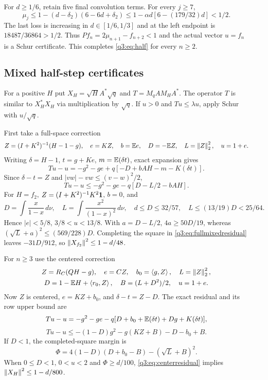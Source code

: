 For $d\ge1/6$, retain five final convolution terms. For every $j\ge7$,
\[
 \mu_j\le1-(d-\delta_{2})(6-6d+\delta_{2})
 \le1-\alpha d[6-(179/32)d]<1/2.
\]
The last loss is increasing in $d\in[1/6,1/3]$ and at the left endpoint is $18487/36864>1/2$. Thus
$Pf_n=2\mu_{n+1}-f_{n+2}<1$ and the actual vector $u=f_n$ is a Schur certificate. This completes \eqref{q3:eq:half} for every $n\ge2$.

\subsection{Mixed half-step certificates}
For a positive $H$ put $X_H=\sqrt H A^*\sqrt q$ and $T=M_qAM_HA^*$. The operator $T$ is similar to $X_H^*X_H$ via multiplication by $\sqrt q$. If $u>0$ and $Tu\le\lambda u$, apply Schur with $u/\sqrt q$.

First take a full-space correction
\[
 Z=(I+K^2)^{-1}(H-1-g),\quad e=KZ,\quad
 b=\mathbb E e,\quad D=-\mathbb E Z,\quad L=\left\lVert Z\right\rVert_2^2,\quad u=1+e.
\]
Writing $\delta=H-1$, $t=g+Ke$, $m=\mathbb E(\delta t)$, exact expansion gives
\[
 Tu-u=-g^2-ge+q[-D+bAH-m-K(\delta t)].
\]
Since $\delta-t=Z$ and $|vw|-vw\le(v-w)^2/2$,
\begin{equation}\label{q3:eq:fullmixedresidual}
 Tu-u\le-g^2-ge-q[D-L/2-bAH].
\end{equation}
For $H=f_2$, $Z=(I+K^2)^{-1}K^2\mathbf1$, $b=0$, and
\[
 D=\int\frac{x}{1-x}\,d\nu,\quad
 L=\int\frac{x^2}{(1-x)^2}\,d\nu,\quad
 d\le D\le32/57,\quad L\le(13/19)D<25/64.
\]
Hence $|e|<5/8$, $3/8<u<13/8$. With $a=D-L/2$,
$4a\ge50D/19$, whereas $(\sqrt L+a)^2\le(569/228)D$.
Completing the square in \eqref{q3:eq:fullmixedresidual} leaves $-31D/912$, so
$\left\lVert X_{f_2}\right\rVert^2\le1-d/48$.

For $n\ge3$ use the centered correction
\[
 \begin{gathered}
 Z=R_C(QH-g),\quad e=CZ,\quad b_0=\left\langle g,Z\right\rangle,\quad L=\left\lVert Z\right\rVert_2^2,\\
 D=1-\mathbb E H+\left\langle r_0,Z\right\rangle,\quad B=(L+D^2)/2,\quad u=1+e.
 \end{gathered}
\]
Now $Z$ is centered, $e=KZ+b_0$, and $\delta-t=Z-D$. The exact residual and its row upper bound are
\[
 Tu-u=-g^2-ge-q[D+b_0+\mathbb E(\delta t)+Dg+K(\delta t)],
\]
\begin{equation}\label{q3:eq:centerresidual}
 Tu-u\le-(1-D)g^2-g(KZ+B)-D-b_0+B.
\end{equation}
If $D<1$, the completed-square margin is
\[
 \Phi=4(1-D)(D+b_0-B)-(\sqrt L+B)^2.
\]
When $0\le D<1$, $0<u<2$ and $\Phi\ge d/100$, \eqref{q3:eq:centerresidual} implies
$\left\lVert X_H\right\rVert^2\le1-d/800$.

